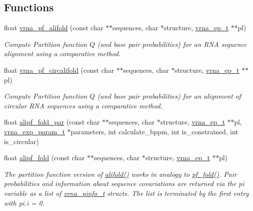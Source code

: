 \subsection*{Functions}
\begin{DoxyCompactItemize}
\item 
float \hyperlink{group__consensus__pf__fold_ga374e31a0f326b2c5da5b84e143a63f38}{vrna\+\_\+pf\+\_\+alifold} (const char $\ast$$\ast$sequences, char $\ast$structure, \hyperlink{group__struct__utils_gab9ac98ab55ded9fb90043b024b915aca}{vrna\+\_\+ep\+\_\+t} $\ast$$\ast$pl)
\begin{DoxyCompactList}\small\item\em Compute Partition function $Q$ (and base pair probabilities) for an R\+NA sequence alignment using a comparative method. \end{DoxyCompactList}\item 
float \hyperlink{group__consensus__pf__fold_gab70fe6c9a78b79cc5669881720926e1d}{vrna\+\_\+pf\+\_\+circalifold} (const char $\ast$$\ast$sequences, char $\ast$structure, \hyperlink{group__struct__utils_gab9ac98ab55ded9fb90043b024b915aca}{vrna\+\_\+ep\+\_\+t} $\ast$$\ast$pl)
\begin{DoxyCompactList}\small\item\em Compute Partition function $Q$ (and base pair probabilities) for an alignment of circular R\+NA sequences using a comparative method. \end{DoxyCompactList}\item 
float \hyperlink{group__consensus__pf__fold_gab46954fb0ed3b6d5631e7f9b802978cd}{alipf\+\_\+fold\+\_\+par} (const char $\ast$$\ast$sequences, char $\ast$structure, \hyperlink{group__struct__utils_gab9ac98ab55ded9fb90043b024b915aca}{vrna\+\_\+ep\+\_\+t} $\ast$$\ast$pl, \hyperlink{group__energy__parameters_ga01d8b92fe734df8d79a6169482c7d8d8}{vrna\+\_\+exp\+\_\+param\+\_\+t} $\ast$parameters, int calculate\+\_\+bppm, int is\+\_\+constrained, int is\+\_\+circular)
\item 
float \hyperlink{group__consensus__pf__fold_ga1a5f6cfb9d761fa862ce4edc7c369cd2}{alipf\+\_\+fold} (const char $\ast$$\ast$sequences, char $\ast$structure, \hyperlink{group__struct__utils_gab9ac98ab55ded9fb90043b024b915aca}{vrna\+\_\+ep\+\_\+t} $\ast$$\ast$pl)
\begin{DoxyCompactList}\small\item\em The partition function version of \hyperlink{group__consensus__mfe__fold_ga4cf00f0659e5f0480335d69e797f05b1}{alifold()} works in analogy to \hyperlink{group__pf__fold_gadc3db3d98742427e7001a7fd36ef28c2}{pf\+\_\+fold()}. Pair probabilities and information about sequence covariations are returned via the \textquotesingle{}pi\textquotesingle{} variable as a list of \hyperlink{group__aln__utils_ga6660dfca23debee7306e0cd53341263f}{vrna\+\_\+pinfo\+\_\+t} structs. The list is terminated by the first entry with pi.\+i = 0. \end{DoxyCompactList}\item 

\end{DoxyCompactItemize}
